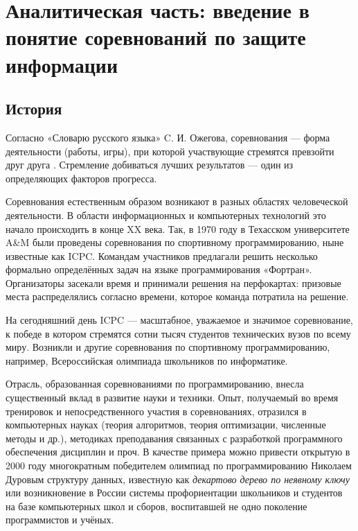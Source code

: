 \chapter{Аналитическая часть: введение в понятие соревнований по защите информации}
\label{cha:analysis}

\section{История}
\label{cha:analysis:history}

Согласно «Словарю русского языка» C. И. Ожегова, соревнования --- форма деятельности (работы, игры), при которой участвующие стремятся превзойти друг друга \cite{Ozhegov89}. Стремление добиваться лучших результатов --- один из определяющих факторов прогресса.


Соревнования естественным образом возникают в разных областях человеческой деятельности. В области информационных и компьютерных технологий это начало происходить в конце XX века. Так, в 1970 году в Техасском университете A\&M были проведены соревнования по спортивному программированию, ныне известные как ICPC\cite{AboutICPC}. Командам участников предлагали решить несколько формально определённых задач на языке программирования «Фортран». Организаторы засекали время и принимали решения на перфокартах: призовые места распределялись согласно времени, которое команда потратила на решение.

На сегодняшний день ICPC — масштабное, уважаемое и значимое соревнование, к победе в котором стремятся сотни тысяч студентов технических вузов по всему миру\cite{AboutICPC}. Возникли и другие соревнования по спортивному программированию, например, Всероссийская олимпиада школьников по информатике\cite{ROI}.

Отрасль, образованная соревнованиями по программированию, внесла существенный вклад в развитие науки и техники. Опыт, получаемый во время тренировок и непосредственного участия в соревнованиях, отразился в компьютерных науках (теория алгоритмов, теория оптимизации, численные методы и др.), методиках преподавания связанных с разработкой программного обеспечения дисциплин и проч. В качестве примера можно привести открытую в 2000 году многократным победителем олимпиад по программированию Николаем Дуровым структуру данных, известную как \textit{декартово дерево по неявному ключу}\cite{Durov00} или возникновение в России системы профориентации школьников и студентов на базе компьютерных школ и сборов, воспитавшей не одно поколение программистов и учёных\cite{Netrusova09}\cite{Kraivanova12}.

